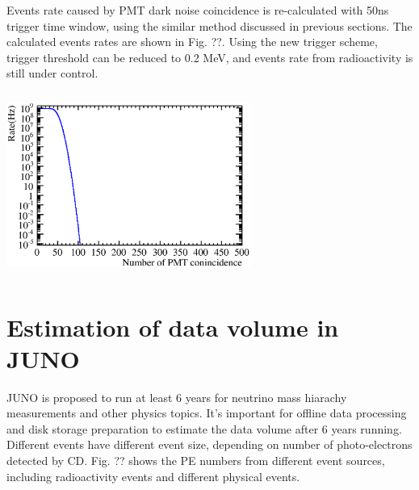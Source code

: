 \documentclass[a4paper,10pt,twoside]{paper}
\begin{document}
	\begin{multicols}{2}

		Events rate caused by PMT dark noise coincidence is re-calculated with 50ns trigger time window, 
		using the similar method discussed in previous sections. The calculated events rates are shown in Fig. ??.
		Using the new trigger scheme, trigger threshold can be reduced to 0.2 MeV, and events rate from radioactivity is still under control.

		\begin{center}
			\includegraphics[width=8cm,height=6cm]{Noise_rate_50kHz_50ns.eps}
		\end{center}

		\section{Estimation of data volume in JUNO}
		JUNO is proposed to run at least 6 years for neutrino mass hiarachy measurements and other physics topics. 
		It's important for offline data processing and disk storage preparation to estimate the data volume after 6 years running. 
		Different events have different event size, depending on number of photo-electrons detected by CD.
		Fig. ?? shows the PE numbers from different event sources, including radioactivity events and different physical events. 



	\end{multicols}
\end{document}

